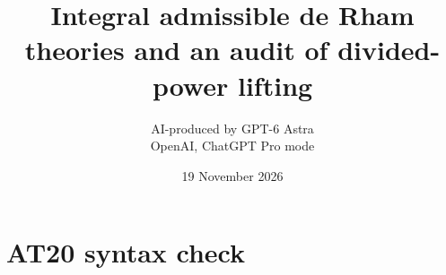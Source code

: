 \documentclass[11pt,a4paper]{article}
\title{Integral admissible de Rham theories and an audit of divided-power lifting}
\author{AI-produced by GPT-6 Astra\\OpenAI, ChatGPT Pro mode}
\date{19 November 2026}
\theoremstyle{definition}
\begin{document}
\section{AT20 syntax check}

\end{document}
